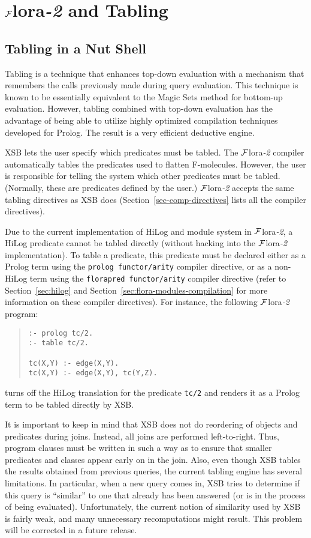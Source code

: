 \documentclass[11pt]{article}
\newcommand{\FLORA}{{\mbox{${\cal F}${\sc lora}\rm\emph{-2}}}\xspace}
\begin{document}
\section{\FLORA and Tabling}\label{sec-tabling-flora}


\subsection{Tabling in a Nut Shell}


%
Tabling is a technique that enhances top-down evaluation with a mechanism
that remembers the calls previously made during query evaluation.
This technique is known to be essentially equivalent to the Magic Sets
method for bottom-up evaluation. However, tabling combined with top-down
evaluation has the advantage of being able to utilize highly optimized
compilation techniques developed for Prolog. The result is a very efficient
deductive engine.

XSB lets the user specify which predicates must be tabled.  The \FLORA
compiler automatically tables the predicates used to flatten F-molecules.
However, the user is responsible for telling the system which other
predicates must be tabled. (Normally, these are predicates defined by the
user.)  \FLORA accepts the same tabling directives as XSB does
(Section~\ref{sec-comp-directives} lists all the compiler directives).

%
Due to the current implementation of HiLog and module system in \FLORA,
a HiLog predicate cannot be tabled directly (without hacking into the
\FLORA implementation). To table a predicate, this predicate must be
declared either as a Prolog term using the \mbox{\tt prolog functor/arity}
compiler directive, or as a non-HiLog term using the
\mbox{\tt florapred functor/arity} compiler directive (refer to
Section~\ref{sec:hilog} and Section~\ref{sec:flora-modules-compilation}
for more information on these compiler directives). For instance,
the following \FLORA program:
\begin{quote}
\begin{verbatim}
:- prolog tc/2.
:- table tc/2.

tc(X,Y) :- edge(X,Y).
tc(X,Y) :- edge(X,Y), tc(Y,Z).
\end{verbatim}
\end{quote}
turns off the HiLog translation for the predicate {\tt tc/2} and
renders it as a Prolog term to be tabled directly by XSB.

It is important to keep in mind that XSB does not do reordering of
objects and predicates during joins. Instead, all joins are performed
left-to-right.  Thus, program clauses must be written in such a way as
to ensure that smaller predicates and classes appear early on in the
join. Also, even though XSB tables the results obtained from previous
queries, the current tabling engine has several limitations. In
particular, when a new query comes in, XSB tries to determine if this
query is ``similar'' to one that already has been answered (or is in
the process of being evaluated).  Unfortunately, the current notion of
similarity used by XSB is fairly weak, and many unnecessary
recomputations might result. This problem will be corrected in a
future release.
\end{document}
